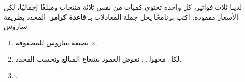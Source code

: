 \begin{statement}
لدينا ثلاث فواتير، كل واحدة تحتوي كميات من نفس ثلاثة منتجات ومبلغًا إجماليًا، لكن الأسعار مفقودة. اكتب برنامجًا يحل جملة المعادلات  بـ \textbf{قاعدة كرامر}: المحدد بطريقة ساروس.
\end{statement}
\begin{stepsbox}\begin{enumerate}
\item {} بصيغة ساروس للمصفوفة ×.
\item لكل مجهول : نعوض العمود  بشعاع المبالغ ونحسب المحدد.
\item {}.
\end{enumerate}\end{stepsbox}
